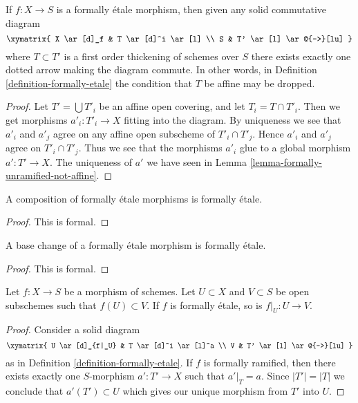 \begin{lemma}
\label{lemma-formally-etale-not-affine}
If $f : X \to S$ is a formally \'etale morphism, then given
any solid commutative diagram
$$
\xymatrix{
X \ar[d]_f & T \ar[d]^i \ar[l] \\
S & T' \ar[l] \ar@{-->}[lu]
}
$$
where $T \subset T'$ is a first order thickening of schemes over $S$
there exists exactly one dotted arrow making the diagram commute.
In other words, in
Definition \ref{definition-formally-etale}
the condition that $T$ be affine may be dropped.
\end{lemma}

\begin{proof}
Let $T' = \bigcup T'_i$ be an affine open covering, and let
$T_i = T \cap T'_i$. Then we get morphisms $a'_i : T'_i \to X$ fitting
into the diagram. By uniqueness we see that $a'_i$ and $a'_j$ agree on
any affine open subscheme of $T'_i \cap T'_j$. Hence $a'_i$ and
$a'_j$ agree on $T'_i \cap T'_j$. Thus we see that the morphisms $a'_i$
glue to a global morphism $a' : T' \to X$. The uniqueness of
$a'$ we have seen in
Lemma \ref{lemma-formally-unramified-not-affine}.
\end{proof}

\begin{lemma}
\label{lemma-composition-formally-etale}
A composition of formally \'etale morphisms is formally \'etale.
\end{lemma}

\begin{proof}
This is formal.
\end{proof}

\begin{lemma}
\label{lemma-base-change-formally-etale}
A base change of a formally \'etale morphism is formally \'etale.
\end{lemma}

\begin{proof}
This is formal.
\end{proof}

\begin{lemma}
\label{lemma-formally-etale-on-opens}
Let $f : X \to S$ be a morphism of schemes.
Let $U \subset X$ and $V \subset S$ be open subschemes such that
$f(U) \subset V$. If $f$ is formally \'etale, so is $f|_U : U \to V$.
\end{lemma}

\begin{proof}
Consider a solid diagram
$$
\xymatrix{
U \ar[d]_{f|_U} & T \ar[d]^i \ar[l]^a \\
V & T' \ar[l] \ar@{-->}[lu]
}
$$
as in Definition \ref{definition-formally-etale}. If $f$ is formally
ramified, then there exists exactly one $S$-morphism $a' : T' \to X$
such that $a'|_T = a$. Since $|T'| = |T|$ we conclude that $a'(T') \subset U$
which gives our unique morphism from $T'$ into $U$.
\end{proof}

